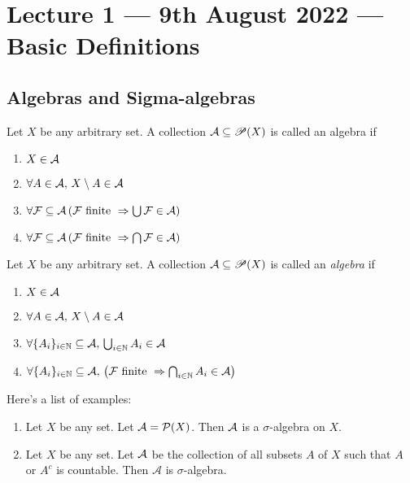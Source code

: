 \section{Lecture 1 --- 9th August 2022 --- Basic Definitions}
\subsection{Algebras and Sigma-algebras}
\begin{definition}[Algebra]
Let $X$ be any arbitrary set. A collection ${\cal A} \subseteq \mathscr P (X)$ is called an algebra if 
\begin{enumerate}
    \item $X\in {\cal A}$
    \item $\forall A \in {\cal A},\, X\setminus A \in {\cal A}$
    \item $\forall {\cal F} \subseteq {\cal A} \left( {\cal F} \text{ finite } \Rightarrow \bigcup {\cal F} \in {\cal A} \right)$
    \item $\forall {\cal F} \subseteq {\cal A} \left( {\cal F} \text{ finite } \Rightarrow \bigcap {\cal F} \in {\cal A} \right)$
\end{enumerate}
\end{definition}

\begin{definition}
Let $X$ be any arbitrary set. A collection ${\cal A} \subseteq \mathscr P (X)$ is called an \textit{algebra} if 
\begin{enumerate}
    \item $X\in {\cal A}$
    \item $\forall A \in {\cal A},\, X\setminus A \in {\cal A}$
    \item $\forall \{ A_i \}_{i\in\mathbb N} \subseteq \mathcal{A}, \,  \bigcup_{i\in \mathbb N} A_i  \in {\cal A} $
    \item $\forall \{ A_i \}_{i\in\mathbb N} \subseteq \mathcal{A},\, \left( {\cal F} \text{ finite } \Rightarrow \bigcap_{i\in\mathbb N} A_i\in {\cal A} \right)$
\end{enumerate}
\end{definition}

\begin{example} Here's a list of examples:
\begin{enumerate}
    \item Let $X$ be any set. Let ${\cal A} ={\cal P} (X)$. Then ${\cal A}$ is a $\sigma$-algebra on $X$.
    \item Let $X$ be any set. Let ${\cal A}$ be the collection of all subsets $A$ of $X$ such that $A$ or $A^c$ is countable. Then $\mathcal{A}$ is $\sigma$-algebra.
\end{enumerate}
\end{example}

